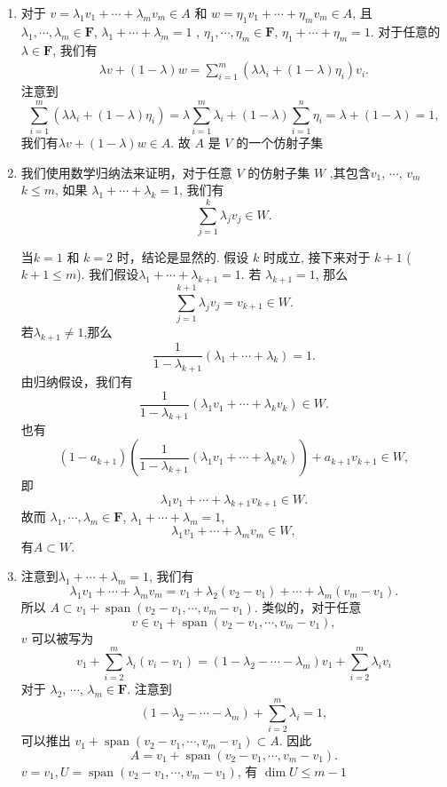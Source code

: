 \documentclass[UTF8,12pt,a4paper,fontset=fandol]{ctexart}
\begin{document}
\begin{solve}
\begin{enumerate}
            \item 对于 $v=\lambda_1 v_1+\cdots+\lambda_m v_m\in A$ 和 $w=\eta_1 v_1+\cdots+\eta_m v_m\in A$, 且 $\lambda_1,\cdots,\lambda_m\in  \mathbf{F}$, $\lambda_1+\cdots+\lambda_m=1$ , $\eta_1,\cdots,\eta_m\in \mathbf{F}$, $\eta_1+\cdots+\eta_m=1$. 对于任意的$\lambda\in \mathbf{F}$, 我们有
            \begin{align*}
                \lambda v+(1-\lambda) w=\sum_{i=1}^m(\lambda\lambda_i+(1-\lambda)\eta_i)v_i.
            \end{align*}
            注意到
            \[ \sum_{i=1}^m(\lambda\lambda_i+(1-\lambda)\eta_i)=\lambda\sum_{i=1}^m\lambda_i+(1-\lambda)\sum_{i=1}^n\eta_i=\lambda+(1-\lambda)=1, \]
            我们有$\lambda v+(1-\lambda) w\in A$. 故 $A$ 是 $V$ 的一个仿射子集
        \item 我们使用数学归纳法来证明，对于任意 $V$ 的仿射子集 $W$ ,其包含$v_1$, $\cdots$, $v_m$$k\le m$,
            如果 $\lambda_1+\cdots+\lambda_k=1$,
            我们有 \[ \sum_{j=1}^k\lambda_jv_j\in W. \]

            当$k=1$ 和 $k=2$ 时，结论是显然的.
            假设 $k$ 时成立,
            接下来对于 $k+1$ ($k+1\leqslant m$).
            我们假设$\lambda_1+\cdots+\lambda_{k+1}=1$.
            若 $\lambda_{k+1}=1$, 那么\[\sum_{j=1}^{k+1}\lambda_jv_j=v_{k+1}\in W.\]
            若$\lambda_{k+1}\ne 1$,那么\[ \frac{1}{1-\lambda_{k+1}}(\lambda_1+\cdots+\lambda_k)=1. \]
            由归纳假设，我们有\[ \frac{1}{1-\lambda_{k+1}}(\lambda_1v_1+\cdots+\lambda_kv_k)\in W. \]
            也有 \[ (1-a_{k+1})\left(\frac{1}{1-\lambda_{k+1}}(\lambda_1v_1+\cdots+\lambda_kv_k)\right)+a_{k+1}v_{k+1}\in W, \]
            即 \[ \lambda_1v_1+\cdots+\lambda_{k+1}v_{k+1}\in W. \]
            故而 $\lambda_1,\cdots,\lambda_m\in  \mathbf{F}$, $\lambda_1+\cdots+\lambda_m=1$,
            \[\lambda_1 v_1+\cdots+\lambda_m v_m\in W,\]有$A\subset W$.
        \item  注意到$\lambda_1+\cdots+\lambda_m=1$, 我们有\[ \lambda_1 v_1+\cdots+\lambda_m v_m=v_1+\lambda_2(v_2-v_1)+\cdots+\lambda_m(v_m-v_1). \]所以 $A\subset v_1+\operatorname{span}(v_2-v_1,\cdots,v_m-v_1)$.
            类似的，对于任意\[v\in v_1+\operatorname{span}(v_2-v_1,\cdots,v_m-v_1),\]$v$ 可以被写为 \[ v_1+\sum_{i=2}^m \lambda_i(v_i-v_1)=(1-\lambda_2-\cdots-\lambda_m)v_1+\sum_{i=2}^m \lambda_i v_i \]
            对于 $\lambda_2$, $\cdots$, $\lambda_m\in \mathbf{F}$. 注意到\[ (1-\lambda_2-\cdots-\lambda_m)+\sum_{i=2}^m \lambda_i=1, \]
            可以推出 $v_1+\operatorname{span}(v_2-v_1,\cdots,v_m-v_1)\subset A$.
            因此\[A=v_1+\operatorname{span}(v_2-v_1,\cdots,v_m-v_1).\]
            $v=v_1, U=\operatorname{span}(v_2-v_1,\cdots,v_m-v_1)$, 有 $\dim U\le m-1$
        \end{enumerate}
\end{solve}
\end{document}
